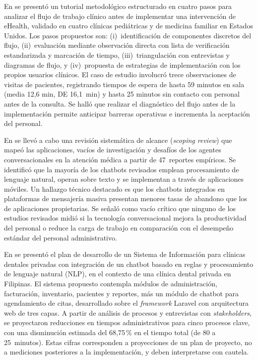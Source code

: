 En \cite{staras2021using} se presentó un tutorial metodológico estructurado en cuatro
pasos para analizar el flujo de trabajo clínico antes de implementar una intervención
de eHealth, validado en cuatro clínicas pediátricas y de medicina familiar en Estados
Unidos. Los pasos propuestos son: (i)~identificación de componentes discretos del
flujo, (ii)~evaluación mediante observación directa con lista de verificación
estandarizada y marcación de tiempo, (iii)~triangulación con entrevistas y diagramas
de flujo, y (iv)~propuesta de estrategias de implementación con los propios usuarios
clínicos. El caso de estudio involucró trece observaciones de visitas de pacientes,
registrando tiempos de espera de hasta 59 minutos en sala (media 12{,}6 min,
DE 16{,}1~min) y hasta 25 minutos sin contacto con personal antes de la consulta.
Se halló que realizar el diagnóstico del flujo antes de la implementación permite
anticipar barreras operativas e incrementa la aceptación del personal.

En \cite{tudorcar2020conversational} se llevó a cabo una revisión sistemática de
alcance (\textit{scoping review}) que mapeó las aplicaciones, vacíos de investigación
y desafíos de los agentes conversacionales en la atención médica a partir de
47~reportes empíricos. Se identificó que la mayoría de los chatbots revisados emplean
procesamiento de lenguaje natural, operan sobre texto y se implementan a través de
aplicaciones móviles. Un hallazgo técnico destacado es que los chatbots integrados en
plataformas de mensajería masiva presentan menores tasas de abandono que los de
aplicaciones propietarias. Se señaló como vacío crítico que ninguno de los estudios revisados
midió si la tecnología conversacional mejora la productividad del personal o reduce la
carga de trabajo en comparación con el desempeño estándar del personal administrativo.

En \cite{alejandrino2023dental} se presentó el plan de desarrollo de un Sistema de
Información para clínicas dentales privadas con integración de un chatbot basado en
reglas y procesamiento de lenguaje natural (NLP), en el contexto de una clínica dental
privada en Filipinas. El sistema propuesto contempla módulos de administración,
facturación, inventario, pacientes y reportes, más un módulo de chatbot para
agendamiento de citas, desarrollado sobre el \textit{framework} Laravel con
arquitectura web de tres capas. A partir de análisis de procesos y entrevistas con
\textit{stakeholders}, se proyectaron reducciones en tiempos administrativos para
cinco procesos clave, con una disminución estimada del 68{,}75\,\% en el tiempo total
(de 80 a 25~minutos). Estas cifras corresponden a proyecciones de un plan de proyecto,
no a mediciones posteriores a la implementación, y deben interpretarse con cautela.

